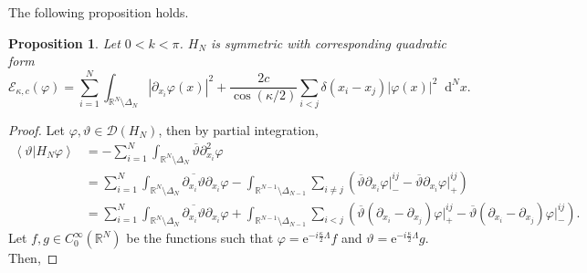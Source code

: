 \documentclass[a4paper,11pt]{article}
\newcommand{\euler}[1]{\text{e}^{#1}}
\newcommand{\abs}[1]{\left\lvert #1 \right\rvert}
\renewcommand{\braket}[1]{\left\langle#1\right\rangle}
\newcommand*\diff{\mathop{}\!\mathrm{d}}
\newcommand{\R}{\mathbb{R}}
\newtheorem{proposition}[theorem]{Proposition}
\numberwithin{equation}{section}
\begin{document}
The following proposition holds.  \begin{proposition}\label{PropositionAnyonQuadraticForm}
				Let $0<k<\pi$. $ H_N $ is symmetric with corresponding quadratic form \begin{equation}
				\mathcal{E}_{\kappa,c}(\varphi)=\sum_{i=1}^{N}\int_{{\R^N\setminus\Delta_N}} \abs{\partial_{x_i}\varphi(x)}^2+\frac{2c}{\cos(\kappa/2)}\sum_{i<j} \delta(x_i-x_j)\abs{\varphi(x)}^2\diff^{N}x.
				\end{equation}
			\end{proposition}
			\begin{proof}
				Let $ \varphi,\vartheta\in \mathcal{D}(H_N) $, then by partial integration, \begin{equation}
				\begin{aligned}
				\braket{\vartheta\vert H_N \varphi}&=-\sum_{i=1}^{N}\int_{\R^N\setminus\Delta_N}\overline{\vartheta} \partial_{x_i}^2\varphi\\&=\sum_{i=1}^{N}\int_{\R^N\setminus\Delta_N}\overline{\partial_{x_i}\vartheta}\partial_{x_i}\varphi-\int_{\R^{N-1}\setminus\Delta_{N-1}}\sum_{i\neq j}\left(\overline{\vartheta}\partial_{x_i}\varphi\vert^{ij}_--\overline{\vartheta}\partial_{x_i}\varphi\vert^{ij}_+\right)\\
				&=\sum_{i=1}^{N}\int_{\R^N\setminus\Delta_N}\overline{\partial_{x_i}\vartheta}\partial_{x_i}\varphi+\int_{\R^{N-1}\setminus\Delta_{N-1}}\sum_{i< j}\left(\overline{\vartheta}(\partial_{x_i}-\partial_{x_j})\varphi\vert^{ij}_+-\overline{\vartheta}(\partial_{x_i}-\partial_{x_j})\varphi\vert^{ij}_-\right).
				\end{aligned}
				\end{equation}
				Let $ f,g\in C^\infty_0(\R^N) $ be the functions such that $ \varphi=\euler{-i\frac{\kappa}{2}\Lambda}f $ and $ \vartheta=\euler{-i\frac{\kappa}{2}\Lambda}g $. Then,
				

\end{proof}
\end{document}
